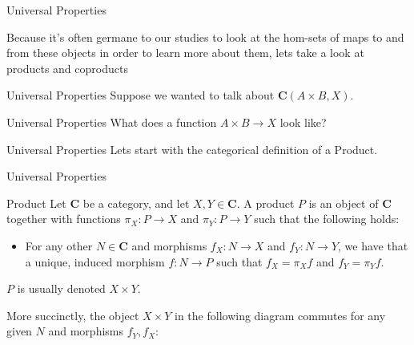 \documentclass[tikz]{beamer}
\theoremstyle{definition}
\begin{document}
\begin{frame}{Universal Properties}

Because it's often germane to our studies to look at the hom-sets of maps to and from these objects in order to learn more about them, lets take a look at products and coproducts

\end{frame}

\begin{frame}{Universal Properties}
    Suppose we wanted to talk about $\mathbf{C}(A \times B, X)$.
\end{frame}

\begin{frame}{Universal Properties}
    What does a function $A \times B \to X$ look like?
\end{frame}{}

\begin{frame}{Universal Properties}
    Lets start with the categorical definition of a Product.
\end{frame}

\begin{frame}{Universal Properties}
    \begin{definition}{Product}
        Let $\mathbf{C}$ be a category, and let $X, Y \in \mathbf{C}$. A product $P$ is an object of $\mathbf{C}$ together with functions $\pi_X: P \to X$ and $\pi_Y: P \to Y$ such that the following holds:
            \begin{itemize}
                \item For any other $N \in \mathbf{C}$ and morphisms $f_X: N \to X$ and $f_Y : N \to Y$, we have that a unique, induced morphism $f : N \to P$ such that $f_X = \pi_Xf$ and $f_Y = \pi_Yf$.
            \end{itemize}
    \end{definition}
    $P$ is usually denoted $X \times Y$.
\end{frame}{}

\begin{frame}[fragile]
More succinctly, the object $X \times Y$ in the following diagram commutes for any given $N$ and morphisms $f_Y, f_X$:

\begin{center}
    {}
\end{center}{}

\end{frame}
\end{document}
